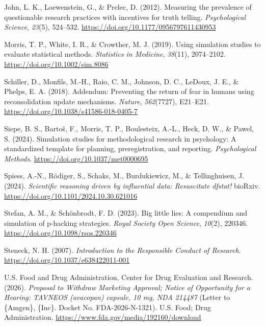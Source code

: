 \documentclass[
  nonatbib,
  authoryear,
  preprint]{elsarticle}
\newlength{\cslhangindent}
\newenvironment{CSLReferences}[2] %
 {\begin{list}{}{%
  \setlength{\itemindent}{0pt}
  \setlength{\leftmargin}{0pt}
  \setlength{\parsep}{0pt}
  \ifodd #1
   \setlength{\leftmargin}{\cslhangindent}
   \setlength{\itemindent}{-1\cslhangindent}
  \fi
  \setlength{\itemsep}{#2\baselineskip}}}
 {\end{list}}
\begin{document}
\begin{CSLReferences}{1}{0}
John, L. K., Loewenstein, G., \& Prelec, D. (2012). Measuring the
prevalence of questionable research practices with incentives for truth
telling. \emph{Psychological Science}, \emph{23}(5), 524--532.
\url{https://doi.org/10.1177/0956797611430953}

Morris, T. P., White, I. R., \& Crowther, M. J. (2019). Using simulation
studies to evaluate statistical methods. \emph{Statistics in Medicine},
\emph{38}(11), 2074--2102. \url{https://doi.org/10.1002/sim.8086}

Schiller, D., Monfils, M.-H., Raio, C. M., Johnson, D. C., LeDoux, J.
E., \& Phelps, E. A. (2018). Addendum: {Preventing} the return of fear
in humans using reconsolidation update mechanisms. \emph{Nature},
\emph{562}(7727), E21--E21.
\url{https://doi.org/10.1038/s41586-018-0405-7}

Siepe, B. S., Bartoš, F., Morris, T. P., Boulesteix, A.-L., Heck, D. W.,
\& Pawel, S. (2024). Simulation studies for methodological research in
psychology: {A} standardized template for planning, preregistration, and
reporting. \emph{Psychological Methods}.
\url{https://doi.org/10.1037/met0000695}

Spiess, A.-N., Rödiger, S., Schaks, M., Burdukiewicz, M., \&
Tellinghuisen, J. (2024). \emph{Scientific reasoning driven by
influential data: Resuscitate dfstat!} bioRxiv.
\url{https://doi.org/10.1101/2024.10.30.621016}

Stefan, A. M., \& Schönbrodt, F. D. (2023). Big little lies: A
compendium and simulation of p-hacking strategies. \emph{Royal Society
Open Science}, \emph{10}(2), 220346.
\url{https://doi.org/10.1098/rsos.220346}

Steneck, N. H. (2007). \emph{Introduction to the {Responsible} {Conduct}
of {Research}}. \url{https://doi.org/10.1037/e638422011-001}

U.S. Food and Drug Administration, Center for Drug Evaluation and
Research. (2026). \emph{Proposal to {Withdraw} {Marketing} {Approval};
{Notice} of {Opportunity} for a {Hearing}: {TAVNEOS} (avacopan) capsule,
10 mg, {NDA} 214487} (Letter to \{Amgen\}, \{Inc\}. Docket No.
FDA-2026-N-1321). U.S. Food; Drug Administration.
\url{https://www.fda.gov/media/192160/download}


\end{CSLReferences}
\end{document}
